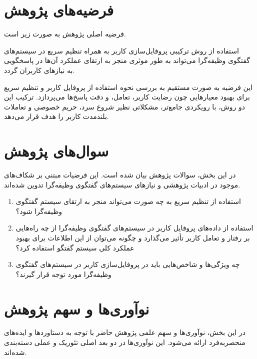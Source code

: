 \section{فرضیه‌های پژوهش}


فرضیه اصلی پژوهش به صورت زیر است.

استفاده از روش ترکیبی پروفایل‌سازی کاربر به همراه تنظیم سریع در سیستم‌های گفتگوی وظیفه‌گرا می‌تواند به طور موثری منجر به ارتقای عملکرد آن‌ها در پاسخگویی به نیازهای کاربران گردد.

این فرضیه به صورت مستقیم به بررسی نحوه استفاده از پروفایل کاربر و تنظیم سریع برای بهبود معیارهایی چون رضایت کاربر، تعامل، و دقت پاسخ‌ها می‌پردازد. ترکیب این دو روش، با رویکردی جامع‌تر، مشکلاتی نظیر شروع سرد، حریم خصوصی و تعاملات بلندمدت کاربر را هدف قرار می‌دهد.


\section{سوال‌های پژوهش}

در این بخش، سوالات پژوهش بیان شده است. این فرضیات مبتنی بر شکاف‌های موجود در ادبیات پژوهشی و نیازهای سیستم‌های گفتگوی وظیفه‌گرا تدوین شده‌اند.

\begin{enumerate}
\item
استفاده از تنظیم سریع به چه صورت می‌تواند منجر به ارتقای سیستم گفتگوی وظیفه‌گرا شود؟

\item
استفاده از داده‌های پروفایل کاربر در سیستم‌های گفتگوی وظیفه‌گرا از چه راه‌هایی بر رفتار و تعامل کاربر تأثیر می‌گذارد و چگونه می‌توان از این اطلاعات برای بهبود عملکرد کلی سیستم گفتگو استفاده کرد؟

\item
چه ویژگی‌ها و شاخص‌هایی باید در پروفایل‌سازی کاربر در سیستم‌های گفتگوی وظیفه‌گرا مورد توجه قرار گیرند؟
\end{enumerate}

\section{نوآوری‌ها و سهم پژوهش}

در این بخش، نوآوری‌ها و سهم علمی پژوهش حاضر با توجه به دستاوردها و ایده‌های منحصربه‌فرد ارائه می‌شود. این نوآوری‌ها در دو بعد اصلی تئوریک و عملی دسته‌بندی شده‌اند.


